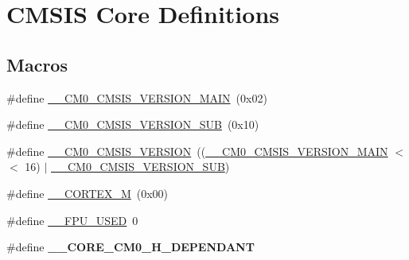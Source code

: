 \hypertarget{group___c_m_s_i_s__core__definitions}{\section{C\-M\-S\-I\-S Core Definitions}
\label{group___c_m_s_i_s__core__definitions}
}
\subsection*{Macros}
\begin{DoxyCompactItemize}
\item 
\#define \hyperlink{group___c_m_s_i_s__core__definitions_gacd01bf0a654a7f15f606593aa636bc72}{\-\_\-\-\_\-\-C\-M0\-\_\-\-C\-M\-S\-I\-S\-\_\-\-V\-E\-R\-S\-I\-O\-N\-\_\-\-M\-A\-I\-N}~(0x02)
\item 
\#define \hyperlink{group___c_m_s_i_s__core__definitions_gab6a85b0d3b2fbcfb62003006ece175cc}{\-\_\-\-\_\-\-C\-M0\-\_\-\-C\-M\-S\-I\-S\-\_\-\-V\-E\-R\-S\-I\-O\-N\-\_\-\-S\-U\-B}~(0x10)
\item 
\#define \hyperlink{group___c_m_s_i_s__core__definitions_gaf233a7b7b2818cc6194e7a9386faccd8}{\-\_\-\-\_\-\-C\-M0\-\_\-\-C\-M\-S\-I\-S\-\_\-\-V\-E\-R\-S\-I\-O\-N}~((\hyperlink{group___c_m_s_i_s__core__definitions_gacd01bf0a654a7f15f606593aa636bc72}{\-\_\-\-\_\-\-C\-M0\-\_\-\-C\-M\-S\-I\-S\-\_\-\-V\-E\-R\-S\-I\-O\-N\-\_\-\-M\-A\-I\-N} $<$$<$ 16) $|$ \hyperlink{group___c_m_s_i_s__core__definitions_gab6a85b0d3b2fbcfb62003006ece175cc}{\-\_\-\-\_\-\-C\-M0\-\_\-\-C\-M\-S\-I\-S\-\_\-\-V\-E\-R\-S\-I\-O\-N\-\_\-\-S\-U\-B})
\item 
\#define \hyperlink{group___c_m_s_i_s__core__definitions_ga63ea62503c88acab19fcf3d5743009e3}{\-\_\-\-\_\-\-C\-O\-R\-T\-E\-X\-\_\-\-M}~(0x00)
\item 
\#define \hyperlink{group___c_m_s_i_s__core__definitions_gaa167d0f532a7c2b2e3a6395db2fa0776}{\-\_\-\-\_\-\-F\-P\-U\-\_\-\-U\-S\-E\-D}~0
\item 
\hypertarget{group___c_m_s_i_s__core__definitions_gac1e2acb34ba7f2543bcb2249bead4aee}{\#define {\bfseries \-\_\-\-\_\-\-C\-O\-R\-E\-\_\-\-C\-M0\-\_\-\-H\-\_\-\-D\-E\-P\-E\-N\-D\-A\-N\-T}}\label{group___c_m_s_i_s__core__definitions_gac1e2acb34ba7f2543bcb2249bead4aee}


\end{DoxyCompactItemize}
